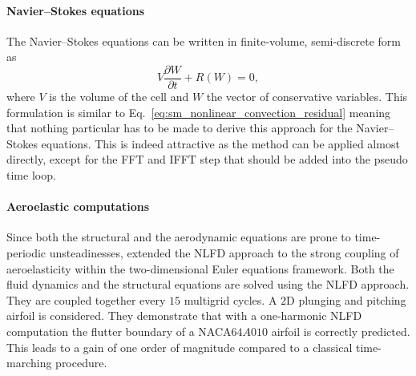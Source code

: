 \paragraph{Navier--Stokes equations}
The Navier--Stokes equations can be written in finite-volume,
semi-discrete form as
\begin{equation}
	V \frac{\partial W}{\partial t} + R(W) = 0,
	\label{eq:navier_stokes_fv_sd}
\end{equation}
where $V$ is the volume of the cell and $W$
the vector of conservative variables.
This formulation is similar to
Eq.~\eqref{eq:sm_nonlinear_convection_residual} meaning that
nothing particular has to be made to derive this approach for
the Navier--Stokes equations. This is indeed attractive as the
method can be applied almost directly, except for the FFT and IFFT
step that should be added into the pseudo time loop.

\paragraph{Aeroelastic computations}
Since both the structural and the aerodynamic equations
are prone to time-periodic unsteadinesses,
\citet{Kachra2008} extended the NLFD approach to the strong coupling of
aeroelasticity within the two-dimensional Euler equations framework.
Both the fluid dynamics and the structural equations
are solved using the NLFD approach. They are coupled together 
every $15$ multigrid cycles.
A $2$D plunging and pitching airfoil is considered.
They demonstrate that with a one-harmonic NLFD computation the
flutter boundary of a NACA$64A010$ airfoil is correctly predicted.
This leads to a gain of one order of magnitude compared to a classical
time-marching procedure. 

